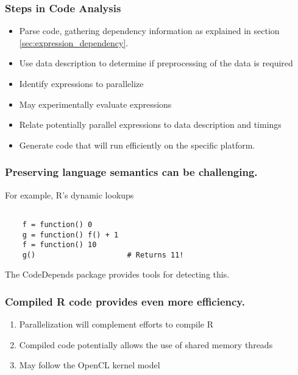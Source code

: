 \documentclass{beamer}
\begin{document}
\begin{frame}

    \frametitle{Steps in Code Analysis}

\begin{itemize}
    \item Parse code, gathering dependency information as explained in
        section \ref{sec:expression_dependency}.
    \item Use data description to determine if preprocessing of the data is
        required
    \item Identify expressions to parallelize
    \item May experimentally evaluate expressions 
    \item Relate potentially parallel expressions to data description and timings
    \item Generate code that will run efficiently on the specific platform.
\end{itemize}

\end{frame}
\begin{frame}[fragile]

   \frametitle{Preserving language semantics can be challenging.}

    For example, R's dynamic lookups 

\begin{verbatim}

    f = function() 0
    g = function() f() + 1
    f = function() 10
    g()                     # Returns 11!

\end{verbatim}

The CodeDepends package provides tools for detecting this.

\end{frame}
\begin{frame}

    \frametitle{Compiled R code provides even more efficiency.}

\begin{enumerate}
    \item Parallelization will complement efforts to compile R
    \item Compiled code potentially allows the use of shared memory threads
    \item May follow the OpenCL kernel model
\end{enumerate}

\end{frame}
\end{document}
